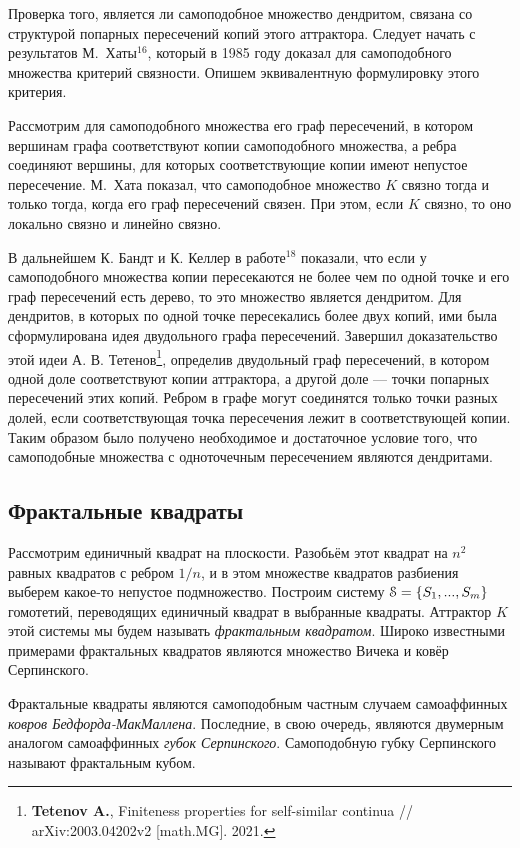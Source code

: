 \documentclass[a5paper,9pt,twoside]{extarticle} %
\begin{document}
Проверка того, является ли самоподобное множество дендритом, связана со структурой попарных пересечений копий этого аттрактора.
Следует начать с результатов М.~Хаты$^{16}$, который в 1985 году доказал для самоподобного множества критерий связности.
Опишем эквивалентную формулировку этого критерия.

Рассмотрим для самоподобного множества его граф пересечений, в котором вершинам графа соответствуют копии самоподобного множества, а ребра соединяют вершины, для которых соответствующие копии имеют непустое пересечение.
М.~Хата показал, что самоподобное множество $K$ связно тогда и только тогда, когда его граф пересечений связен. 
При этом, если $K$ связно, то оно локально связно и линейно связно.

В дальнейшем К. Бандт и К. Келлер в работе$^{18}$ показали, что если у самоподобного множества копии пересекаются не более чем по одной точке и его граф пересечений есть дерево, то это множество является дендритом. Для дендритов, в которых по одной точке пересекались более двух копий, ими была сформулирована идея двудольного графа пересечений. 
Завершил доказательство этой идеи А. В. Тетенов\footnote{{\bf Tetenov A.}, Finiteness properties for self-similar continua // arXiv:2003.04202v2 [math.MG]. 2021.}, определив двудольный граф пересечений, в котором одной доле соответствуют копии аттрактора, а другой доле --- точки попарных пересечений этих копий. Ребром в графе могут соединятся только точки разных долей, если соответствующая точка пересечения лежит в соответствующей копии.
Таким образом было получено необходимое и достаточное условие того, что самоподобные множества с одноточечным пересечением являются дендритами.\\


\subsection{Фрактальные квадраты}

Рассмотрим единичный квадрат на плоскости.
Разобьём этот квадрат на $n^2$ равных квадратов с ребром $1/n$, и в этом множестве  квадратов  разбиения выберем какое-то непустое подмножество.
Построим систему ${\EuScript S}=\{S_1,...,S_m\}$  гомотетий, переводящих единичный квадрат в выбранные  квадраты. Аттрактор $K$ этой системы мы будем называть {\em фрактальным квадратом}.
 Широко известными примерами фрактальных квадратов являются множество Вичека и ковёр Серпинского.

Фрактальные квадраты являются самоподобным частным случаем самоаффинных {\em ковров Бедфорда-МакМаллена}. 
Последние, в свою очередь, являются двумерным аналогом самоаффинных {\em губок Серпинского}.
Самоподобную губку Серпинского называют фрактальным кубом.
\end{document}
